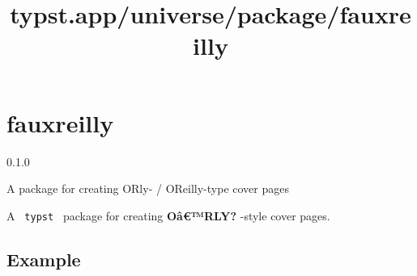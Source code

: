 \title{typst.app/universe/package/fauxreilly}

\label{banner}
\section{fauxreilly}\label{fauxreilly}

{ 0.1.0 }

A package for creating O\textquotesingle Rly- /
O\textquotesingle Reilly-type cover pages

\label{readme}
\href{https://forthebadge.com/}{\pandocbounded{}}

\href{https://deilayborer.neocities.org/funding}{}

A \texttt{\ typst\ } package for creating \textbf{Oâ€™RLY?} -style cover
pages.

\subsection{Example}\label{example}

\begin{Shaded}
\begin{Highlighting}[]
\OperatorTok{:} \OperatorTok{*}

\OperatorTok{:}\NormalTok{)}\OperatorTok{,}
\OperatorTok{:} \OperatorTok{,}
\OperatorTok{{-}}\OperatorTok{:} \OperatorTok{,}
\OperatorTok{:} \OperatorTok{,}
\OperatorTok{:} \OperatorTok{,}
\OperatorTok{:} 
\NormalTok{)}
\end{Highlighting}
\end{Shaded}


